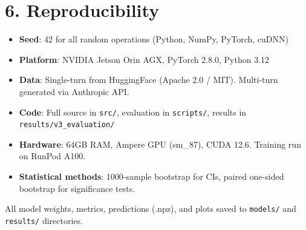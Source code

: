 \documentclass[
  11pt,
]{report}
\providecommand{\tightlist}{%
  \setlength{\itemsep}{0pt}\setlength{\parskip}{0pt}}
\begin{document}
\section{6. Reproducibility}\label{reproducibility}

\begin{itemize}
\tightlist
\item
  \textbf{Seed}: 42 for all random operations (Python, NumPy, PyTorch,
  cuDNN)
\item
  \textbf{Platform}: NVIDIA Jetson Orin AGX, PyTorch 2.8.0, Python 3.12
\item
  \textbf{Data}: Single-turn from HuggingFace (Apache 2.0 / MIT).
  Multi-turn generated via Anthropic API.
\item
  \textbf{Code}: Full source in \texttt{src/}, evaluation in
  \texttt{scripts/}, results in \texttt{results/v3\_evaluation/}
\item
  \textbf{Hardware}: 64GB RAM, Ampere GPU (sm\_87), CUDA 12.6. Training
  run on RunPod A100.
\item
  \textbf{Statistical methods}: 1000-sample bootstrap for CIs, paired
  one-sided bootstrap for significance tests.
\end{itemize}

All model weights, metrics, predictions (.npz), and plots saved to
\texttt{models/} and \texttt{results/} directories.
\end{document}
